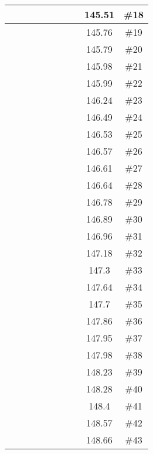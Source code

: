 \begin{center}
\begin{longtable}{|c|c|c|c|c|c|c|c|c|c|}
 \x &  \x &  &  &  &  &  &  \x & 145.51 & \#18 \\ \hline
 \x &  &  \x &  &  \x &  \x &  &  \x & 145.76 & \#19 \\ \hline
 \x &  \x &  \x &  &  \x &  &  &  \x & 145.79 & \#20 \\ \hline
 \x &  \x &  \x &  &  \x &  \x &  \x &  & 145.98 & \#21 \\ \hline
 \x &  &  \x &  &  &  &  &  & 145.99 & \#22 \\ \hline
 \x &  &  &  &  \x &  &  &  & 146.24 & \#23 \\ \hline
 \x &  \x &  \x &  &  \x &  \x &  &  & 146.49 & \#24 \\ \hline
 \x &  &  \x &  &  &  \x &  &  \x & 146.53 & \#25 \\ \hline
 \x &  \x &  \x &  &  &  &  &  & 146.57 & \#26 \\ \hline
 \x &  \x &  \x &  &  \x &  \x &  \x &  \x & 146.61 & \#27 \\ \hline
 \x &  \x &  &  \x &  \x &  \x &  \x &  & 146.64 & \#28 \\ \hline
 \x &  \x &  \x &  \x &  \x &  \x &  \x &  \x & 146.78 & \#29 \\ \hline
 \x &  \x &  \x &  \x &  \x &  \x &  \x &  & 146.89 & \#30 \\ \hline
 \x &  \x &  &  &  &  &  &  & 146.96 & \#31 \\ \hline
 \x &  \x &  \x &  &  &  \x &  &  & 147.18 & \#32 \\ \hline
 \x &  &  \x &  \x &  &  \x &  &  \x & 147.3 & \#33 \\ \hline
 \x &  &  &  &  &  \x &  \x &  \x & 147.64 & \#34 \\ \hline
 \x &  &  \x &  &  &  &  &  \x & 147.7 & \#35 \\ \hline
 \x &  \x &  \x &  &  &  &  &  \x & 147.86 & \#36 \\ \hline
 \x &  &  &  &  \x &  \x &  \x &  \x & 147.95 & \#37 \\ \hline
 \x &  &  \x &  &  &  \x &  &  & 147.98 & \#38 \\ \hline
 \x &  &  &  &  \x &  \x &  \x &  & 148.23 & \#39 \\ \hline
 \x &  \x &  &  \x &  &  \x &  \x &  \x & 148.28 & \#40 \\ \hline
 \x &  &  &  \x &  \x &  \x &  \x &  & 148.4 & \#41 \\ \hline
 \x &  \x &  &  \x &  &  \x &  &  & 148.57 & \#42 \\ \hline
 \x &  \x &  \x &  \x &  &  &  &  \x & 148.66 & \#43 \\ \hline

\end{longtable}
\end{center}
